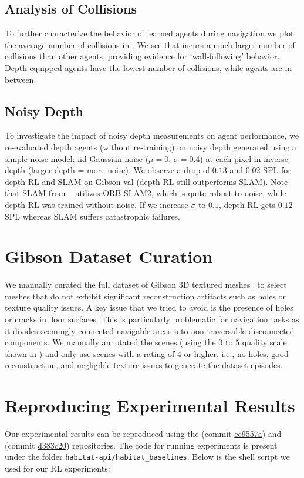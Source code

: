 \subsection{Analysis of Collisions}

To further characterize the behavior of learned agents during navigation we plot the average number of collisions in .
We see that \blind incurs a much larger number of collisions than other agents, providing evidence for `wall-following' behavior.
Depth-equipped agents have the lowest number of collisions, while \rgb agents are in between.

\subsection{Noisy Depth}

To investigate the impact of noisy depth measurements on agent performance, we re-evaluated depth agents (without re-training) on noisy depth generated using a simple noise model: iid Gaussian noise ($\mu=0$, $\sigma=0.4$) at each pixel in inverse depth (larger depth = more noise).
We observe a drop of $0.13$ and $0.02$ SPL for depth-RL and SLAM on Gibson-val (depth-RL still outperforms SLAM).
Note that SLAM from ~\cite{mishkin2019benchmarking} utilizes ORB-SLAM2, which is quite robust to noise, while depth-RL was trained without noise.
If we increase $\sigma$ to $0.1$, depth-RL gets $0.12$ SPL whereas SLAM suffers catastrophic failures.

\section{Gibson Dataset Curation}

We manually curated the full dataset of Gibson 3D textured meshes~\cite{Xia2018} to select meshes that do not exhibit significant reconstruction artifacts such as holes or texture quality issues.
A key issue that we tried to avoid is the presence of holes or cracks in floor surfaces.
This is particularly problematic for navigation tasks as it divides seemingly connected navigable areas into non-traversable disconnected components.
We manually annotated the scenes (using the $0$ to $5$ quality scale shown in ) and only use scenes with a rating of $4$ or higher, i.e., no holes, good reconstruction, and negligible texture issues to generate the dataset episodes.

\section{Reproducing Experimental Results}
Our experimental results can be reproduced using the \habitatapi (commit \href{https://github.com/facebookresearch/habitat-api/tree/ec9557a3623991208a80f836fe557f8028209297}{ec9557a}) and \habitatsim (commit \href{https://github.com/facebookresearch/habitat-sim/tree/d383c2011bf1baab2ce7b3cd40aea573ad2ddf71}{d383c20}) repositories. The code for running experiments is present under the folder \texttt{habitat-api/habitat\_baselines}. Below is the shell script we used for our RL experiments:

